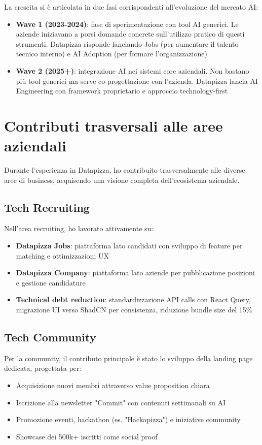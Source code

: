 La crescita si è articolata in due fasi corrispondenti all'evoluzione del mercato AI:
\begin{itemize}
  \item \textbf{Wave 1 (2023-2024)}: fase di sperimentazione con tool AI generici. Le aziende iniziavano a porsi domande concrete sull'utilizzo pratico di questi strumenti. Datapizza risponde lanciando Jobs (per aumentare il talento tecnico interno) e AI Adoption (per formare l'organizzazione)
  
  \item \textbf{Wave 2 (2025+)}: integrazione AI nei sistemi core aziendali. Non bastano più tool generici ma serve co-progettazione con l'azienda. Datapizza lancia AI Engineering con framework proprietario e approccio technology-first
\end{itemize}


\section{Contributi trasversali alle aree aziendali}
Durante l'esperienza in Datapizza, ho contribuito trasversalmente alle diverse aree di business, acquisendo una visione completa dell'ecosistema aziendale.

\subsection{Tech Recruiting}
Nell'area recruiting, ho lavorato attivamente su:
\begin{itemize}
  \item \textbf{Datapizza Jobs}: piattaforma lato candidati con sviluppo di feature per matching e ottimizzazioni UX
  \item \textbf{Datapizza Company}: piattaforma lato aziende per pubblicazione posizioni e gestione candidature
  \item \textbf{Technical debt reduction}: standardizzazione API calls con React Query, migrazione UI verso ShadCN per consistenza, riduzione bundle size del 15\%
\end{itemize}

\subsection{Tech Community}
Per la community, il contributo principale è stato lo sviluppo della landing page dedicata, progettata per:
\begin{itemize}
  \item Acquisizione nuovi membri attraverso value proposition chiara
  \item Iscrizione alla newsletter "Commit" con contenuti settimanali su AI
  \item Promozione eventi, hackathon (es. "Hackapizza") e iniziative community
  \item Showcase dei 500k+ iscritti come social proof
\end{itemize}

